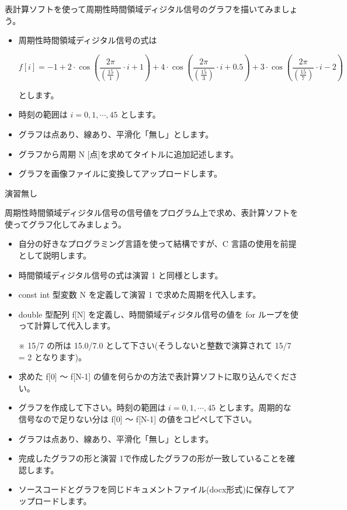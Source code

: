 \documentclass[a4paper]{jarticle}
\begin{document}



 表計算ソフトを使って周期性時間領域ディジタル信号のグラフを描いてみましょう。\par
\vspace{1zh}
\begin{itemize}
\item 周期性時間領域ディジタル信号の式は

\[
f[i] = 
-1
+ 2 \cdot \cos \left ( \frac{2 \pi}{ \left ( \frac{15}{1} \right ) } \cdot i + 1 \right )
+ 4 \cdot \cos \left ( \frac{2 \pi}{ \left ( \frac{15}{3} \right ) } \cdot i +0.5 \right )
+ 3 \cdot \cos \left ( \frac{2 \pi}{ \left ( \frac{15}{7} \right ) } \cdot i -2 \right )
\]

とします。
\item 時刻の範囲は $i = 0, 1,  \cdots, 45$ とします。
\item グラフは点あり、線あり、平滑化「無し」とします。
\item グラフから周期 $\textrm{N}$ [点]を求めてタイトルに追加記述します。
\item グラフを画像ファイルに変換してアップロードします。
\end{itemize}


\vspace{2zh}
\noindent 演習無し


 周期性時間領域ディジタル信号の信号値をプログラム上で求め、表計算ソフトを使ってグラフ化してみましょう。\par
\par\vspace{1zh}
\begin{itemize}
\item 自分の好きなプログラミング言語を使って結構ですが、C 言語の使用を前提として説明します。
\item 時間領域ディジタル信号の式は演習 1 と同様とします。
\item const int 型変数 N を定義して演習 1 で求めた周期を代入します。
\item double 型配列 f[N] を定義し、時間領域ディジタル信号の値を for ループを使って計算して代入します。\par
 ※ 15/7 の所は 15.0/7.0 として下さい(そうしないと整数で演算されて 15/7 = 2 となります)。
\item 求めた f[0] 〜 f[N-1] の値を何らかの方法で表計算ソフトに取り込んでください。
\item グラフを作成して下さい。時刻の範囲は $i = 0, 1,  \cdots, 45$ とします。周期的な信号なので足りない分は f[0] 〜 f[N-1] の値をコピペして下さい。
\item グラフは点あり、線あり、平滑化「無し」とします。
\item 完成したグラフの形と演習 1で作成したグラフの形が一致していることを確認します。
\item ソースコードとグラフを同じドキュメントファイル(docx形式)に保存してアップロードします。
\end{itemize}
\end{document}
